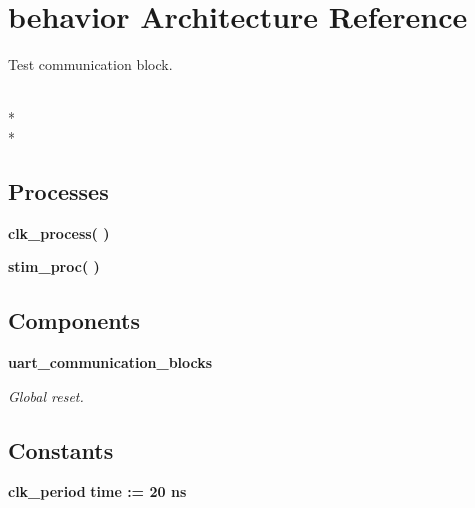 \section{behavior Architecture Reference}
\label{classtest_uart__communication__block_1_1behavior}


Test communication block.  


\\*
\\*
\subsection*{Processes}
 \begin{DoxyCompactItemize}
\item 
{\bf clk\-\_\-process}{\bfseries  (  )}\label{classtest_uart__communication__block_1_1behavior_ac5bb218131b813f7908ec89476b31fca}

\item 
{\bf stim\-\_\-proc}{\bfseries  (  )}\label{classtest_uart__communication__block_1_1behavior_ad2efa6785cff833c341e27596b21aeb5}

\end{DoxyCompactItemize}
\subsection*{Components}
 \begin{DoxyCompactItemize}
\item 
{\bf uart\-\_\-communication\-\_\-blocks}  {\bfseries }  
\begin{DoxyCompactList}\small\item\em Global reset. \end{DoxyCompactList}\end{DoxyCompactItemize}
\subsection*{Constants}
 \begin{DoxyCompactItemize}
\item 
{\bf clk\-\_\-period} {\bfseries time  \-:=  20  ns } \label{classtest_uart__communication__block_1_1behavior_a8252996498fe95d9d966fbb376552eaf}

\end{DoxyCompactItemize}
